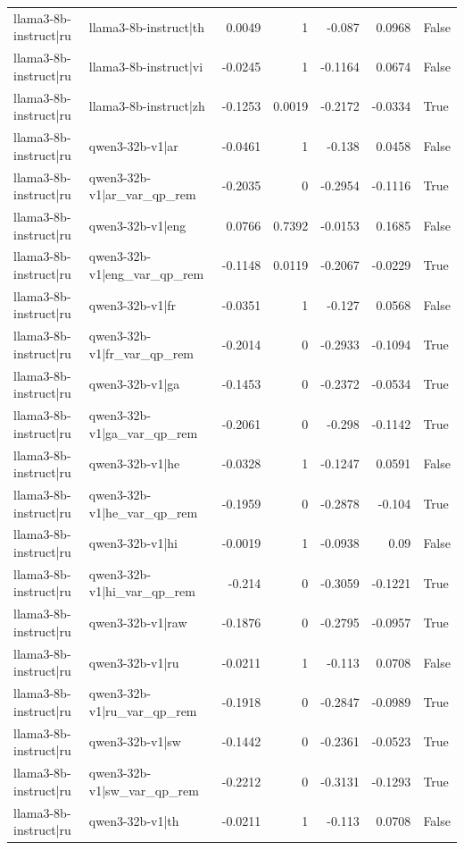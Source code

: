 \begin{table}
\begin{tabular}{l l r r r r l}
llama3-8b-instruct|ru & llama3-8b-instruct|th & 0.0049 & 1 & -0.087 & 0.0968 & False \\
llama3-8b-instruct|ru & llama3-8b-instruct|vi & -0.0245 & 1 & -0.1164 & 0.0674 & False \\
llama3-8b-instruct|ru & llama3-8b-instruct|zh & -0.1253 & 0.0019 & -0.2172 & -0.0334 & True \\
llama3-8b-instruct|ru & qwen3-32b-v1|ar & -0.0461 & 1 & -0.138 & 0.0458 & False \\
llama3-8b-instruct|ru & qwen3-32b-v1|ar_var_qp_rem & -0.2035 & 0 & -0.2954 & -0.1116 & True \\
llama3-8b-instruct|ru & qwen3-32b-v1|eng & 0.0766 & 0.7392 & -0.0153 & 0.1685 & False \\
llama3-8b-instruct|ru & qwen3-32b-v1|eng_var_qp_rem & -0.1148 & 0.0119 & -0.2067 & -0.0229 & True \\
llama3-8b-instruct|ru & qwen3-32b-v1|fr & -0.0351 & 1 & -0.127 & 0.0568 & False \\
llama3-8b-instruct|ru & qwen3-32b-v1|fr_var_qp_rem & -0.2014 & 0 & -0.2933 & -0.1094 & True \\
llama3-8b-instruct|ru & qwen3-32b-v1|ga & -0.1453 & 0 & -0.2372 & -0.0534 & True \\
llama3-8b-instruct|ru & qwen3-32b-v1|ga_var_qp_rem & -0.2061 & 0 & -0.298 & -0.1142 & True \\
llama3-8b-instruct|ru & qwen3-32b-v1|he & -0.0328 & 1 & -0.1247 & 0.0591 & False \\
llama3-8b-instruct|ru & qwen3-32b-v1|he_var_qp_rem & -0.1959 & 0 & -0.2878 & -0.104 & True \\
llama3-8b-instruct|ru & qwen3-32b-v1|hi & -0.0019 & 1 & -0.0938 & 0.09 & False \\
llama3-8b-instruct|ru & qwen3-32b-v1|hi_var_qp_rem & -0.214 & 0 & -0.3059 & -0.1221 & True \\
llama3-8b-instruct|ru & qwen3-32b-v1|raw & -0.1876 & 0 & -0.2795 & -0.0957 & True \\
llama3-8b-instruct|ru & qwen3-32b-v1|ru & -0.0211 & 1 & -0.113 & 0.0708 & False \\
llama3-8b-instruct|ru & qwen3-32b-v1|ru_var_qp_rem & -0.1918 & 0 & -0.2847 & -0.0989 & True \\
llama3-8b-instruct|ru & qwen3-32b-v1|sw & -0.1442 & 0 & -0.2361 & -0.0523 & True \\
llama3-8b-instruct|ru & qwen3-32b-v1|sw_var_qp_rem & -0.2212 & 0 & -0.3131 & -0.1293 & True \\
llama3-8b-instruct|ru & qwen3-32b-v1|th & -0.0211 & 1 & -0.113 & 0.0708 & False \\

\end{tabular}
\end{table}
